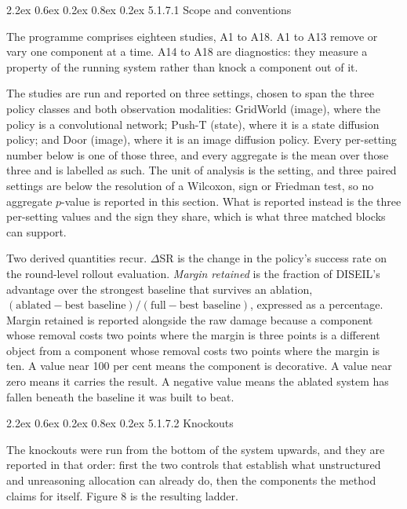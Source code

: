 \documentclass[
  11pt,
]{article}
\makeatletter
\renewcommand\paragraph{\@startsection{paragraph}{4}{\z@}%
  {2.2ex \@plus 0.6ex \@minus 0.2ex}%
  {0.8ex \@plus 0.2ex}%
  {\normalfont\normalsize\bfseries}}
\makeatother
\begin{document}
\hypertarget{scope-and-conventions}{%
\paragraph{5.1.7.1 Scope and conventions}\label{scope-and-conventions}}

The programme comprises eighteen studies, A1 to A18. A1 to A13 remove or
vary one component at a time. A14 to A18 are diagnostics: they measure a
property of the running system rather than knock a component out of it.

The studies are run and reported on three settings, chosen to span the
three policy classes and both observation modalities: GridWorld (image),
where the policy is a convolutional network; Push-T (state), where it is
a state diffusion policy; and Door (image), where it is an image
diffusion policy. Every per-setting number below is one of those three,
and every aggregate is the mean over those three and is labelled as
such. The unit of analysis is the setting, and three paired settings are
below the resolution of a Wilcoxon, sign or Friedman test, so no
aggregate \(p\)-value is reported in this section. What is reported
instead is the three per-setting values and the sign they share, which
is what three matched blocks can support.

Two derived quantities recur. \(\Delta\)SR is the change in the policy's
success rate on the round-level rollout evaluation. \emph{Margin
retained} is the fraction of DISEIL's advantage over the strongest
baseline that survives an ablation,
\((\text{ablated} - \text{best baseline}) / (\text{full} - \text{best baseline})\),
expressed as a percentage. Margin retained is reported alongside the raw
damage because a component whose removal costs two points where the
margin is three points is a different object from a component whose
removal costs two points where the margin is ten. A value near 100 per
cent means the component is decorative. A value near zero means it
carries the result. A negative value means the ablated system has fallen
beneath the baseline it was built to beat.

\hypertarget{knockouts}{%
\paragraph{5.1.7.2 Knockouts}\label{knockouts}}

The knockouts were run from the bottom of the system upwards, and they
are reported in that order: first the two controls that establish what
unstructured and unreasoning allocation can already do, then the
components the method claims for itself. Figure 8 is the resulting
ladder.
\end{document}
